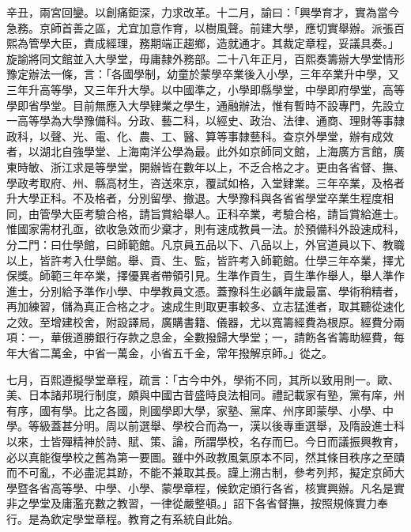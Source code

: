 \begin{pinyinscope}
辛丑，兩宮回鑾。以創痛鉅深，力求改革。十二月，諭曰：「興學育才，實為當今急務。京師首善之區，尤宜加意作育，以樹風聲。前建大學，應切實舉辦。派張百熙為管學大臣，責成經理，務期端正趨鄉，造就通才。其裁定章程，妥議具奏。」旋諭將同文館並入大學堂，毋庸隸外務部。二十八年正月，百熙奏籌辦大學堂情形豫定辦法一條，言：「各國學制，幼童於蒙學卒業後入小學，三年卒業升中學，又三年升高等學，又三年升大學。以中國準之，小學即縣學堂，中學即府學堂，高等學即省學堂。目前無應入大學肄業之學生，通融辦法，惟有暫時不設專門，先設立一高等學為大學豫備科。分政、藝二科，以經史、政治、法律、通商、理財等事隸政科，以聲、光、電、化、農、工、醫、算等事隸藝科。查京外學堂，辦有成效者，以湖北自強學堂、上海南洋公學為最。此外如京師同文館，上海廣方言館，廣東時敏、浙江求是等學堂，開辦皆在數年以上，不乏合格之才。更由各省督、撫、學政考取府、州、縣高材生，咨送來京，覆試如格，入堂肄業。三年卒業，及格者升大學正科。不及格者，分別留學、撤退。大學豫科與各省省學堂卒業生程度相同，由管學大臣考驗合格，請旨賞給舉人。正科卒業，考驗合格，請旨賞給進士。惟國家需材孔亟，欲收急效而少棄才，則有速成教員一法。於預備科外設速成科，分二門：曰仕學館，曰師範館。凡京員五品以下、八品以上，外官道員以下、教職以上，皆許考入仕學館。舉、貢、生、監，皆許考入師範館。仕學三年卒業，擇尤保獎。師範三年卒業，擇優異者帶領引見。生準作貢生，貢生準作舉人，舉人準作進士，分別給予準作小學、中學教員文憑。蓋豫科生必齲年歲最富、學術稍精者，再加練習，儲為真正合格之才。速成生則取更事較多、立志猛進者，取其聽從速化之效。至增建校舍，附設譯局，廣購書籍、儀器，尤以寬籌經費為根原。經費分兩項：一，華俄道勝銀行存款之息金，全數撥歸大學堂；一，請飭各省籌助經費，每年大省二萬金，中省一萬金，小省五千金，常年撥解京師。」從之。

七月，百熙遵擬學堂章程，疏言：「古今中外，學術不同，其所以致用則一。歐、美、日本諸邦現行制度，頗與中國古昔盛時良法相同。禮記載家有塾，黨有庠，州有序，國有學。比之各國，則國學即大學，家塾、黨庠、州序即蒙學、小學、中學。等級蓋甚分明。周以前選舉、學校合而為一，漢以後專重選舉，及隋設進士科以來，士皆殫精神於詩、賦、策、論，所謂學校，名存而巳。今日而議振興教育，必以真能復學校之舊為第一要圖。雖中外政教風氣原本不同，然其條目秩序之至賾而不可亂，不必盡泥其跡，不能不兼取其長。謹上溯古制，參考列邦，擬定京師大學暨各省高等學、中學、小學、蒙學章程，候欽定頒行各省，核實興辦。凡名是實非之學堂及庸濫充數之教習，一律從嚴整頓。」詔下各省督撫，按照規條實力奉行。是為欽定學堂章程。教育之有系統自此始。


\end{pinyinscope}
